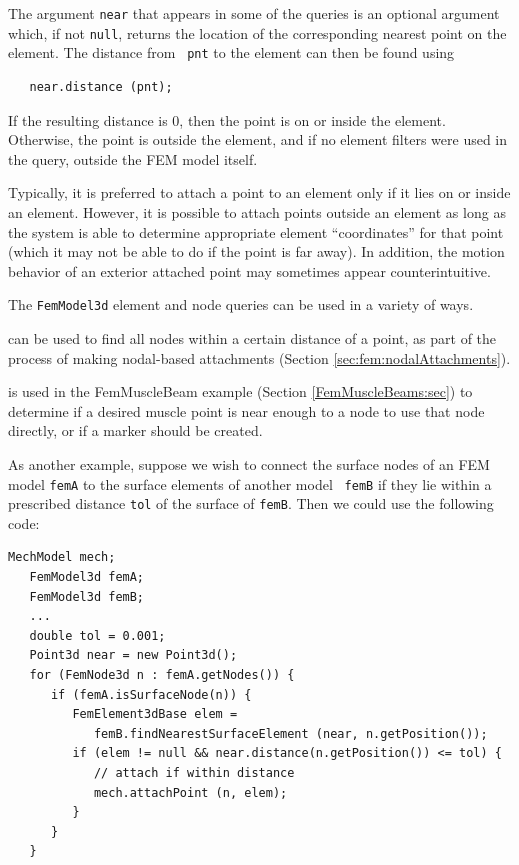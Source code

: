 The argument {\tt near} that appears in some of the queries is an
optional argument which, if not {\tt null}, returns the location of
the corresponding nearest point on the element. The distance from {\tt
pnt} to the element can then be found using
%
\begin{verbatim}
   near.distance (pnt);
\end{verbatim}
%
If the resulting distance is 0, then the point is on or inside the
element. Otherwise, the point is outside the element, and if no
element filters were used in the query, outside the FEM model itself.

\begin{sideblock}
Typically, it is preferred to attach a point to an element only if it
lies on or inside an element. However, it is possible to attach points
outside an element as long as the system is able to determine
appropriate element ``coordinates'' for that point (which it may not
be able to do if the point is far away). In addition, the motion
behavior of an exterior attached point may sometimes appear
counterintuitive.
\end{sideblock}

The {\tt FemModel3d} element and node queries can be used in a variety
of ways.

can be used to find all nodes within a certain distance of a point, as
part of the process of making nodal-based attachments
(Section \ref{sec:fem:nodalAttachments}).

is used in the FemMuscleBeam example
(Section \ref{FemMuscleBeams:sec}) to determine if a desired muscle
point is near enough to a node to use that node directly, or if a
marker should be created.

As another example, suppose we wish to connect the surface nodes of an
FEM model {\tt femA} to the surface elements of another model {\tt
femB} if they lie within a prescribed distance {\tt tol} of the
surface of {\tt femB}. Then we could use the following code:
%
\begin{lstlisting}[]
   MechModel mech;
   FemModel3d femA;
   FemModel3d femB;
   ...
   double tol = 0.001;
   Point3d near = new Point3d();
   for (FemNode3d n : femA.getNodes()) {
      if (femA.isSurfaceNode(n)) {
         FemElement3dBase elem = 
            femB.findNearestSurfaceElement (near, n.getPosition());
         if (elem != null && near.distance(n.getPosition()) <= tol) {
            // attach if within distance
            mech.attachPoint (n, elem);
         }
      }
   }
\end{lstlisting}
%


